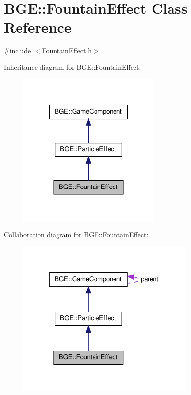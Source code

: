 \hypertarget{class_b_g_e_1_1_fountain_effect}{\section{B\-G\-E\-:\-:Fountain\-Effect Class Reference}
\label{class_b_g_e_1_1_fountain_effect}
}


{\ttfamily \#include $<$Fountain\-Effect.\-h$>$}



Inheritance diagram for B\-G\-E\-:\-:Fountain\-Effect\-:
\nopagebreak
\begin{figure}[H]
\begin{center}
\leavevmode
\includegraphics[width=200pt]{class_b_g_e_1_1_fountain_effect__inherit__graph}
\end{center}
\end{figure}


Collaboration diagram for B\-G\-E\-:\-:Fountain\-Effect\-:
\nopagebreak
\begin{figure}[H]
\begin{center}
\leavevmode
\includegraphics[width=249pt]{class_b_g_e_1_1_fountain_effect__coll__graph}
\end{center}
\end{figure}
